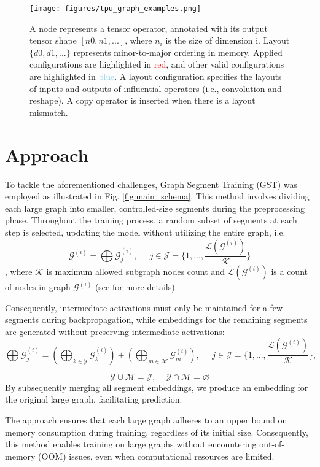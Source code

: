 \documentclass{article}
\begin{document}
\begin{figure}
\label{fig:tpu_graph}
    \centering
    \texttt{[image: figures/tpu\_graph\_examples.png]}
    \caption{A node represents a tensor operator, annotated with its output tensor shape $[n0, n1, ...]$,
where $n_i$
is the size of dimension i. Layout $\{d0, d1, ...\}$ represents minor-to-major ordering in
memory. Applied configurations are highlighted in \textcolor{red}{red}, and other valid configurations are highlighted
in \textcolor{SkyBlue}{blue}. A layout configuration specifies the layouts of inputs and outputs of influential operators (i.e.,
convolution and reshape). A copy operator is inserted when there is a layout mismatch.}
\end{figure}

\section{Approach}
\label{sec:approach}

To tackle the aforementioned challenges, Graph Segment Training (GST) was employed as illustrated in Fig. \ref{fig:main_schema}. This method involves dividing each large graph into smaller, controlled-size segments during the preprocessing phase. Throughout the training process, a random subset of segments at each step is selected, updating the model without utilizing the entire graph, i.e. $$\mathcal{G}^{(i)} = \bigoplus \mathcal{G}^{(i)}_{j}, \; \; \; \; \; j \in \mathcal{J} = \{1, ... , \frac{\mathcal{L}(\mathcal{G}^{(i)})}{\mathcal{K}}\}$$, where $\mathcal{K}$ is maximum allowed subgraph nodes count and $\mathcal{L}(\mathcal{G}^{(i)})$ is a count of nodes in graph $\mathcal{G}^{(i)}$ (see \cite{cao2023learning} for more details). 

Consequently, intermediate activations must only be maintained for a few segments during backpropagation, while embeddings for the remaining segments are generated without preserving intermediate activations:
$$\bigoplus \mathcal{G}^{(i)}_{j} = (\bigoplus_{k \in \mathcal{Y}} \mathcal{G}^{(i)}_{k}) + (\bigoplus_{m \in \mathcal{M}} \mathcal{G}^{(i)}_{m}), \; \; \; \; \;j \in \mathcal{J} = \{1, ... , \frac{\mathcal{L}(\mathcal{G}^{(i)})}{\mathcal{K}}\}, $$

$$\mathcal{Y} \cup \mathcal{M} = \mathcal{J}, \:\:\:\;\: \mathcal{Y}  \cap \mathcal{M} = \varnothing $$
By subsequently merging all segment embeddings, we produce an embedding for the original large graph, facilitating prediction.

The approach ensures that each large graph adheres to an upper bound on memory consumption during training, regardless of its initial size. Consequently, this method enables training on large graphs without encountering out-of-memory (OOM) issues, even when computational resources are limited.
\end{document}
